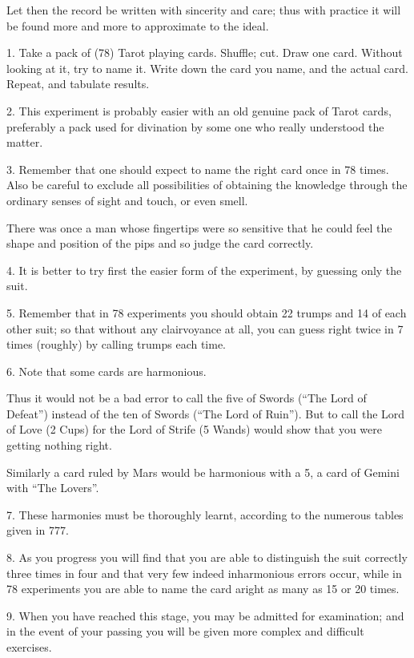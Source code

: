Let then the record be written with sincerity and care; thus with practice it will be found more and more to approximate to the ideal.



1. Take a pack of (78) Tarot playing cards. Shuffle; cut. Draw one card. Without looking at it, try to name it. Write down the card you name, and the actual card. Repeat, and tabulate results.

2. This experiment is probably easier with an old genuine pack of Tarot cards, preferably a pack used for divination by some one who really understood the matter.

3. Remember that one should expect to name the right card once in 78 times. Also be careful to exclude all possibilities of obtaining the knowledge through the ordinary senses of sight and touch, or even smell.

There was once a man whose fingertips were so sensitive that he could feel the shape and position of the pips and so judge the card correctly.

4. It is better to try first the easier form of the experiment, by guessing only the suit.

5. Remember that in 78 experiments you should obtain 22 trumps and 14 of each other suit; so that without any clairvoyance at all, you can guess right twice in 7 times (roughly) by calling trumps each time.

6. Note that some cards are harmonious.

Thus it would not be a bad error to call the five of Swords (\enquote{The Lord of Defeat}) instead of the ten of Swords (\enquote{The Lord of Ruin}). But to call the Lord of Love (2 Cups) for the Lord of Strife (5 Wands) would show that you were getting nothing right.

Similarly a card ruled by Mars would be harmonious with a 5, a card of Gemini with \enquote{The Lovers}.

7. These harmonies must be thoroughly learnt, according to the numerous tables given in 777.

8. As you progress you will find that you are able to distinguish the suit correctly three times in four and that very few indeed inharmonious errors occur, while in 78 experiments you are able to name the card aright as many as 15 or 20 times.

9. When you have reached this stage, you may be admitted for examination; and in the event of your passing you will be given more complex and difficult exercises.

